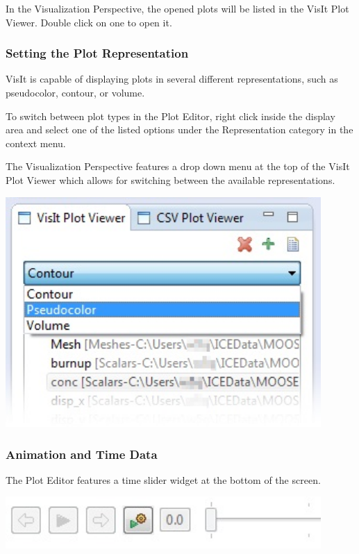 \documentclass{article}
\begin{document}
In the Visualization Perspective, the opened plots will be listed in the VisIt
Plot Viewer. Double click on one to open it.

\subsubsection{Setting the Plot Representation}

VisIt is capable of displaying plots in several different representations, such
as pseudocolor, contour, or volume.

To switch between plot types in the Plot Editor, right click inside the display
area and select one of the listed options under the Representation category in the
context menu.

The Visualization Perspective features a drop down menu at the top of the VisIt
Plot Viewer which allows for switching between the available representations. 

\begin{center}
\includegraphics[width=12cm]{images/VisItRepresentationDropDown}
\end{center}

\subsubsection{Animation and Time Data}

The Plot Editor features a time slider widget at the bottom of the screen. 

\begin{center}
\includegraphics[width=12cm]{images/TimeSliderWidget}
\end{center}
\end{document}
